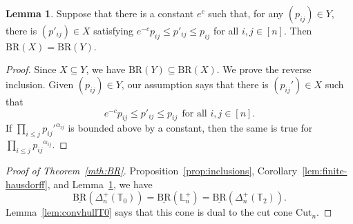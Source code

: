 \documentclass{amsart}
\theoremstyle{definition}
\newtheorem{lemma}[theorem]{Lemma}
\theoremstyle{remark}
\def\T{\mathbb{T}}
\def\L{\mathbb{L}}
\def\BR{\mathrm{BR}}
\def\Cut{\mathrm{Cut}}
\begin{document}
\begin{lemma}
\label{lem:same-BR}
Suppose that there is a constant $e^c$ such that, 
for any $(p_{ij}) \in Y$, there is 
$(p'_{ij})\in X$ satisfying $e^{-c}p_{ij}\le p'_{ij}\le p_{ij}$ for all $i,j \in [n]$. Then $\BR(X)=\BR(Y)$.
\end{lemma}
\begin{proof}
Since $X\subseteq Y$, we have $\BR(Y)\subseteq \BR(X)$. 
We prove the reverse inclusion. Given $(p_{ij}) \in Y$,
our assumption says that there is $(p_{ij}') \in X$ such that
\[
e^{-c}p_{ij}\le p'_{ij}\le p_{ij} \ \ \text{for all $i,j \in [n]$.}
\]
If $\prod_{i\le  j}  {p_{ij}'}^{\alpha_{ij}}$ is bounded above by a constant, then the same is true for $\prod_{i\le  j}  {p_{ij}}^{\alpha_{ij}}$.
\end{proof}


\begin{proof}[Proof of Theorem~\ref{mth:BR}]
Proposition~\ref{prop:inclusions}, Corollary~\ref{lem:finite-hausdorff}, and 
Lemma~\ref{lem:same-BR}, we have
\[
\underline{\BR}(\Delta_n^+(\T_0))=\underline{\BR}(\L_n^+)=\underline{\BR}(\Delta_n^+(\T_2)).
\]
Lemma~\ref{lem:convhullT0} says that this cone is dual to the cut cone $\Cut_n$.
\end{proof}
\end{document}
